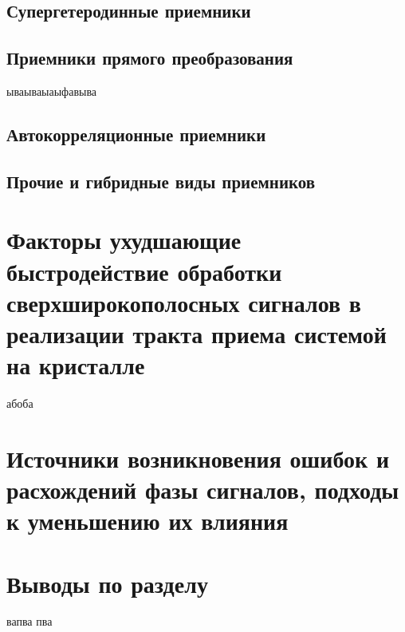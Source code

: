 \subsection{Супергетеродинные приемники}

\subsection{Приемники прямого преобразования}
ываываыаыфавыва

\subsection{Автокорреляционные приемники}

\subsection{Прочие и гибридные виды приемников}

\section{Факторы ухудшающие быстродействие обработки сверхширокополосных сигналов в реализации тракта приема системой на кристалле}
абоба

\section{Источники возникновения ошибок и расхождений фазы сигналов, подходы к уменьшению их влияния}

\section{Выводы по разделу}
вапва пва